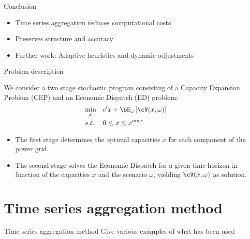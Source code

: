 \begin{frame}{Conclusion}
    \begin{itemize}
        \item Time series aggregation reduces computational costs
        \item Preserves structure and accuracy
        \item Further work: Adaptive heuristics and dynamic adjustments
    \end{itemize}
\end{frame}

\begin{frame}{Problem description}
  
  We consider a two stage stochastic program consisting of a Capacity Expansion Problem (CEP) and an Economic Dispatch (ED) problem:
    \begin{align*}
      \min_{x} \quad & c'x + \bE_{\omega}\left[\cV(x,\omega)\right] \\ 
      s.t. \;   \quad  & 0 \leq x \leq x^{max}
    \end{align*}
    \begin{itemize}
      \item The first stage determines the optimal capacities \(x\) for each component of the power grid. %
      \item The second stage solves the Economic Dispatch for a given time horizon in function of the capacities \(x\) and the scenario \(\omega\), yielding \(\cV(x,\omega)\) as solution.
    \end{itemize}



\end{frame}

\section{Time series aggregation method}
\begin{frame}{Time series aggregation method}
  Give various examples of what has been used
\end{frame}


